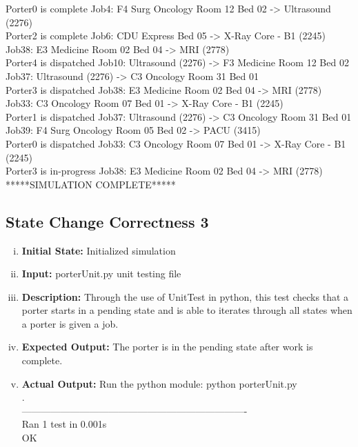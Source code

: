 \documentclass[paper=letter, fontsize=10pt]{scrartcl}
\numberwithin{equation}{section}		%
\numberwithin{figure}{section}			%
\numberwithin{table}{section}				%
\begin{document}
\begin{enumerate}[(i)]
Porter0 is complete Job4: F4 Surg Oncology Room 12 Bed 02 -> Ultrasound (2276)\\
Porter2 is complete Job6: CDU Express Bed 05 -> X-Ray Core - B1 (2245)\\
Job38: E3 Medicine Room 02 Bed 04 -> MRI (2778)\\
Porter4 is dispatched Job10: Ultrasound (2276) -> F3 Medicine Room 12 Bed 02\\
Job37: Ultrasound (2276) -> C3 Oncology Room 31 Bed 01\\
Porter3 is dispatched Job38: E3 Medicine Room 02 Bed 04 -> MRI (2778)\\
Job33: C3 Oncology Room 07 Bed 01 -> X-Ray Core - B1 (2245)\\
Porter1 is dispatched Job37: Ultrasound (2276) -> C3 Oncology Room 31 Bed 01\\
Job39: F4 Surg Oncology Room 05 Bed 02 -> PACU (3415)\\
Porter0 is dispatched Job33: C3 Oncology Room 07 Bed 01 -> X-Ray Core - B1 (2245)\\
Porter3 is in-progress Job38: E3 Medicine Room 02 Bed 04 -> MRI (2778)\\
*****SIMULATION COMPLETE*****\\
\end{enumerate}

\subsection{State Change Correctness 3}
\begin{enumerate}[(i)]
		\item \textbf{Initial State:} Initialized simulation
		\item \textbf{Input:} porterUnit.py unit testing file
		\item \textbf{Description:} Through the use of UnitTest in python, this test checks that a porter starts in a pending state and is able to iterates through all states when a porter is given a job.
		\item \textbf{Expected Output:} The porter is in the pending state after work is complete.
		\item \textbf{Actual Output:} Run the python module: python porterUnit.py\\
.\\
----------------------------------------------------------------------\\
Ran 1 test in 0.001s\\

OK
\end{enumerate}
\end{document}
